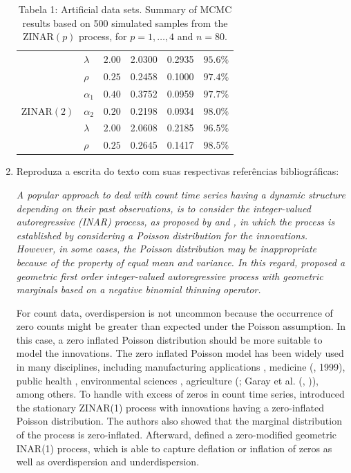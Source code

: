 \documentclass[11pt]{article}
\begin{document}
\begin{enumerate}
\begin{table}[H]
\begin{tabular}{clllll}
                                     & $\lambda$  & $\mathbf{2.00}$ & 2.0300    & 0.2935   & $95.6\%$  \\
                                     & $\rho$     & $\mathbf{0.25}$ & 0.2458    & 0.1000   & $97.4\%$  \\ \hline
\multirow{3}{*}{$\mathrm{ZINAR}(2)$} & $\alpha_1$ & $\mathbf{0.40}$ & 0.3752    & 0.0959   & $97.7\%$  \\
                                     & $\alpha_2$ & $\mathbf{0.20}$ & 0.2198    & 0.0934   & $98.0\%$  \\
                                     & $\lambda$  & $\mathbf{2.00}$ & 2.0608    & 0.2185   & $96.5\%$  \\
\multicolumn{1}{l}{}                 & $\rho$     & $\mathbf{0.25}$ & 0.2645    & 0.1417   & $98.5\%$  \\ \hline
\end{tabular}
\caption{Tabela 1: Artificial data sets. Summary of MCMC results based on 500 simulated samples from the $\mathrm{ZINAR}(p)$ process, for $p = 1, \dots, 4$ and $n = 80$.}
\label{tab:my-table}
\end{table}
\item Reproduza a escrita do texto com suas respectivas referências bibliográficas:

\textit{A popular approach to deal with count time series having a dynamic structure depending on their
past observations, is to consider the integer-valued autoregressive (INAR) process, as proposed by \cite{Alzaid1987} and \cite{McKenzie1998}, in which the process is established by considering a
Poisson distribution for the innovations. However, in some cases, the Poisson distribution may be
inappropriate because of the property of equal mean and variance. In this regard, \cite{Ristic2009} proposed a geometric first order integer-valued autoregressive process with geometric marginals based on a negative binomial thinning operator.}

For count data, overdispersion is not uncommon because the occurrence of zero counts might be greater
than expected under the Poisson assumption. In this case, a zero inflated Poisson distribution should
be more suitable to model the innovations. The zero inflated Poisson model has been widely used in many disciplines, including manufacturing applications \citep{Lambert1992}, medicine (\citeauthor{Bohning1999}, 1999), public health \citep{Zhou2000}, environmental sciences \citep{Agarwal2002}, agriculture (\cite{Hall2000}; Garay et al. (\citeyear{Garay2011}, \citeyear{Garay2015})), among others. To handle with excess of zeros in count time series, \cite{Jazi2015} introduced the stationary ZINAR(1) process with innovations having a zero-inflated Poisson distribution. The authors also showed that the marginal distribution of the process
is zero-inflated. Afterward, \cite{Barreto2015} defined a zero-modified geometric INAR(1) process, which is able to capture deflation or inflation of zeros as well as overdispersion and underdispersion.


\end{enumerate}
\end{document}
